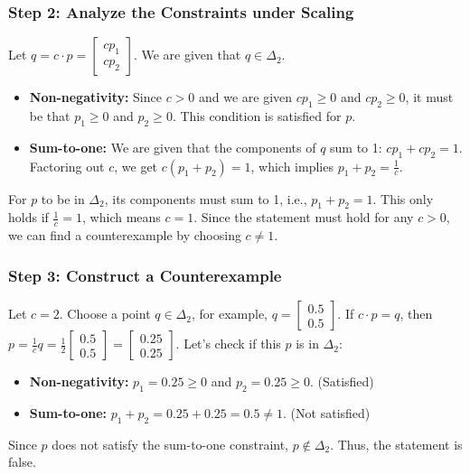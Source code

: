 \documentclass{article}
\begin{document}
\subsubsection*{Step 2: Analyze the Constraints under Scaling}
\parbox{\textwidth}{Let $q = c \cdot p = \begin{bmatrix} c p_1 \\ c p_2 \end{bmatrix}$. We are given that $q \in \Delta_2$.
\begin{itemize}
    \item \textbf{Non-negativity:} Since $c > 0$ and we are given $c p_1 \geq 0$ and $c p_2 \geq 0$, it must be that $p_1 \geq 0$ and $p_2 \geq 0$. This condition is satisfied for $p$.
    \item \textbf{Sum-to-one:} We are given that the components of $q$ sum to 1: $c p_1 + c p_2 = 1$. Factoring out $c$, we get $c(p_1 + p_2) = 1$, which implies $p_1 + p_2 = \frac{1}{c}$.
\end{itemize}
For $p$ to be in $\Delta_2$, its components must sum to 1, i.e., $p_1 + p_2 = 1$. This only holds if $\frac{1}{c} = 1$, which means $c=1$. Since the statement must hold for any $c > 0$, we can find a counterexample by choosing $c \neq 1$.}

\subsubsection*{Step 3: Construct a Counterexample}
\parbox{\textwidth}{Let $c=2$. Choose a point $q \in \Delta_2$, for example, $q = \begin{bmatrix} 0.5 \\ 0.5 \end{bmatrix}$.
If $c \cdot p = q$, then $p = \frac{1}{c} q = \frac{1}{2} \begin{bmatrix} 0.5 \\ 0.5 \end{bmatrix} = \begin{bmatrix} 0.25 \\ 0.25 \end{bmatrix}$.
Let's check if this $p$ is in $\Delta_2$:
\begin{itemize}
    \item \textbf{Non-negativity:} $p_1 = 0.25 \geq 0$ and $p_2 = 0.25 \geq 0$. (Satisfied)
    \item \textbf{Sum-to-one:} $p_1 + p_2 = 0.25 + 0.25 = 0.5 \neq 1$. (Not satisfied)
\end{itemize}
Since $p$ does not satisfy the sum-to-one constraint, $p \notin \Delta_2$. Thus, the statement is false.}
\end{document}
